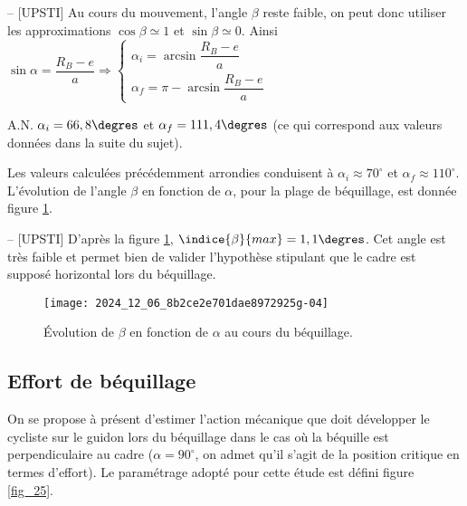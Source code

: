 \ifprof
\begin{corrige}-- [UPSTI]
Au cours du mouvement, l’angle $\beta$ reste faible, on peut donc utiliser les approximations $\cos\beta\simeq 1$ et $\sin\beta\simeq 0$.
Ainsi $\sin\alpha=\dfrac{R_B-e}{a} \Rightarrow \left\{ \begin{array}{l} 
\alpha_i=\arcsin\dfrac{R_B-e}{a} \\
\alpha_f=\pi -\arcsin \dfrac{R_B-e}{a}
\end{array}\right.$

A.N. $\alpha_i=66,8\degres$ et $\alpha_f=111,4\degres$ (ce qui correspond aux valeurs données dans la suite du sujet).

\end{corrige}
\else
\fi

Les valeurs calculées précédemment arrondies conduisent à \(\alpha_{i} \approx 70^{\circ}\) et \(\alpha_{f} \approx 110^{\circ}\). L'évolution de l'angle \(\beta\) en fonction de \(\alpha\), pour la plage de béquillage, est donnée figure \ref{fig_24}.

\ifprof
\begin{corrige}-- [UPSTI]
D’après la figure \ref{fig_24}, $\indice{\beta}{max}=1,1\degres$. Cet angle est très faible et permet bien de valider l’hypothèse stipulant que le cadre est supposé horizontal lors du béquillage.
\end{corrige}
\else
\fi

\ifprof
\else
\begin{figure}[!htb]
\begin{center}
\texttt{[image: 2024\_12\_06\_8b2ce2e701dae8972925g-04]}
\caption{Évolution de \(\beta\) en fonction de \(\alpha\) au cours du béquillage. \label{fig_24}}
\end{center}
\end{figure}
\fi


\subsection{Effort de béquillage}
\ifprof
\else
On se propose à présent d'estimer l'action mécanique que doit développer le cycliste sur le guidon lors du béquillage dans le cas où la béquille est perpendiculaire au cadre (\(\alpha=90^{\circ}\), on admet qu'il s'agit de la position critique en termes d'effort). Le paramétrage adopté pour cette étude est défini figure \ref{fig_25}.\\

